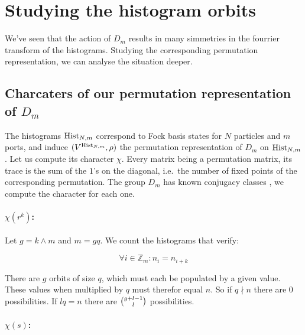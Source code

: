 \section{Studying  the histogram orbits}

We've seen that the action of $D_{m}$ results in many simmetries in the fourrier transform of the histograms. Studying the corresponding permutation representation, we can analyse the situation deeper.

\subsection{Charcaters of our permutation representation of $D_{m}$}

The histograms $\operatorname{Hist}_{N,m}$ correspond to Fock basis states for $N$ particles and $m$ ports, and induce $(V^{\operatorname{Hist}_{N,m}},\rho)$ the permutation representation of $D_{m}$ on $\operatorname{Hist}_{N,m}$. Let us compute its character $\chi$. Every matrix being a permutation matrix, its trace is the sum of the $1$'s on the diagonal, i.e.\ the number of fixed points of the corresponding permutation. The group $D_{m}$ has known conjugacy classes \cite{dirreps}, we compute the character for each one.

\paragraph{$\chi(r^{k})$:} Let $g = k \wedge m$ and $m = gq$. We count the histograms that verify:

\[\forall i \in \mathbb{Z}_{m}: n_{i} = n_{i+k}\]

There are $g$ orbits of size $q$, which must each be populated by a given value. These values when multiplied by $q$ must therefor equal $n$. So if $q \nmid n$ there are $0$ possibilities. If $lq = n$ there are ${{g + l - 1} \choose {l}}$ possibilities.




\paragraph{$\chi(s)$:}

